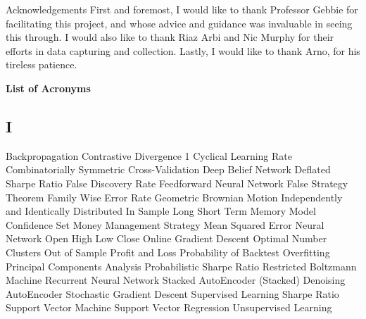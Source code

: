 \documentclass[a4paper,11pt,oneside]{article}
\theoremstyle{plain}
\theoremstyle{definition}
\begin{document}
	
	\newpage
	\LARGE Acknowledgements
	\newline
	\hfill \break 
	\normalsize
	First and foremost, I would like to thank Professor Gebbie for facilitating this project, and whose advice and guidance was invaluable in seeing this through. I would also like to thank Riaz Arbi and Nic Murphy for their efforts in data capturing and collection. Lastly, I would like to thank Arno, for his tireless patience.
	
	\newpage
	
	\tableofcontents
	
	\listoffigures
	
	\listoftables
	
	\newpage
	
	\LARGE{\textbf{List of Acronyms}}

	\normalsize
	\begin{acronym}[OCSVM]  %
	
	\section*{I}
		
			Backpropagation
			Contrastive Divergence 1
			Cyclical Learning Rate
			Combinatorially Symmetric Cross-Validation
			Deep Belief Network
			Deflated Sharpe Ratio
			False Discovery Rate
			Feedforward Neural Network
			False Strategy Theorem
			Family Wise Error Rate
			Geometric Brownian Motion
				Independently and Identically Distributed
				In Sample
			Long Short Term Memory
			Model Confidence Set
			Money Management Strategy
			Mean Squared Error
			Neural Network
	 Open High Low Close
			Online Gradient Descent
			Optimal Number Clusters
			Out of Sample
	 			Profit and Loss
			Probability of Backtest Overfitting
			Principal Components Analysis
			Probabilistic Sharpe Ratio
			Restricted Boltzmann Machine
			Recurrent Neural Network
			Stacked AutoEncoder
	 (Stacked) Denoising AutoEncoder
			Stochastic Gradient Descent
				Supervised Learning
				Sharpe Ratio
				Support Vector Machine
				Support Vector Regression
				Unsupervised Learning
		
		
		
	\end{acronym}
	
\end{document}
